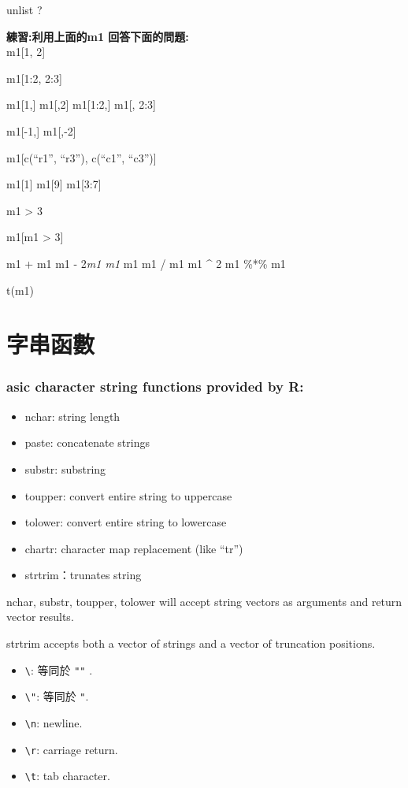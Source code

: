 \documentclass[]{book}
\providecommand{\tightlist}{%
  \setlength{\itemsep}{0pt}\setlength{\parskip}{0pt}}
\theoremstyle{definition}
\theoremstyle{definition}
\theoremstyle{definition}
\theoremstyle{remark}
\begin{document}
unlist ?

\textbf{練習:利用上面的m1 回答下面的問題:}\\
m1{[}1, 2{]}

m1{[}1:2, 2:3{]}

m1{[}1,{]} m1{[},2{]} m1{[}1:2,{]} m1{[}, 2:3{]}

m1{[}-1,{]} m1{[},-2{]}

m1{[}c(``r1'', ``r3''), c(``c1'', ``c3''){]}

m1{[}1{]} m1{[}9{]} m1{[}3:7{]}

m1 \textgreater{} 3

m1{[}m1 \textgreater{} 3{]}

m1 + m1 m1 - 2\emph{m1 m1 } m1 m1 / m1 m1 \^{} 2 m1 \%*\% m1

t(m1)

\section{字串函數}

\hypertarget{asic-character-string-functions-provided-by-r}{%
\subsubsection{asic character string functions provided by
R:}\label{asic-character-string-functions-provided-by-r}}

\begin{itemize}
\tightlist
\item
  nchar: string length\\
\item
  paste: concatenate strings
\item
  substr: substring
\item
  toupper: convert entire string to uppercase
\item
  tolower: convert entire string to lowercase
\item
  chartr: character map replacement (like ``tr'')
\item
  strtrim：trunates string
\end{itemize}

nchar, substr, toupper, tolower will accept string vectors as arguments
and return vector results.

strtrim accepts both a vector of strings and a vector of truncation
positions.

\begin{itemize}
\tightlist
\item
  \texttt{\textbackslash{}\textquotesingle{}}: 等同於
  \texttt{"\textquotesingle{}"} .\\
\item
  \texttt{\textbackslash{}"}: 等同於
  \texttt{\textquotesingle{}"\textquotesingle{}}.\\
\item
  \texttt{\textbackslash{}n}: newline.\\
\item
  \texttt{\textbackslash{}r}: carriage return.\\
\item
  \texttt{\textbackslash{}t}: tab character.
\end{itemize}
\end{document}
